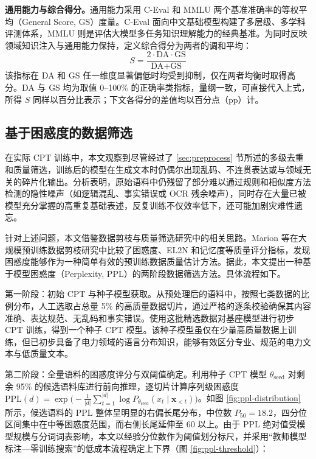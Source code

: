\documentclass[fontset=fandol,type=master,campus=shenzhen,etitleauto=true]{hithesisbook}
\begin{document}
\textbf{通用能力与综合得分。}通用能力采用 C-Eval 和 MMLU 两个基准准确率的等权平均（General Score, GS）度量。C-Eval 面向中文基础模型构建了多层级、多学科评测体系\cite{ref66}，MMLU 则是评估大模型多任务知识理解能力的经典基准\cite{ref67}。为同时反映领域知识注入与通用能力保持，定义综合得分为两者的调和平均：
\begin{equation}
S = \frac{2 \cdot \text{DA} \cdot \text{GS}}{\text{DA} + \text{GS}}
\end{equation}
该指标在 DA 和 GS 任一维度显著偏低时均受到抑制，仅在两者均衡时取得高分。DA 与 GS 均为取值 0--100\% 的正确率类指标，量纲一致，可直接代入上式，所得 $S$ 同样以百分比表示；下文各得分的差值均以百分点（pp）计。

\subsection{基于困惑度的数据筛选}\label{ux57faux4e8eux56f0ux60d1ux5ea6ux7684ux6570ux636eux7b5bux9009}

在实际 CPT 训练中，本文观察到尽管经过了 \ref{sec:preprocess} 节所述的多级去重和质量筛选，训练后的模型在生成文本时仍偶尔出现乱码、不连贯表达或与领域无关的碎片化输出。分析表明，原始语料中仍残留了部分难以通过规则和相似度方法检测的隐性噪声（如逻辑混乱、事实错误或 OCR 残余噪声），同时存在大量已被模型充分掌握的高重复基础表述，反复训练不仅效率低下，还可能加剧灾难性遗忘。

针对上述问题，本文借鉴数据剪枝与质量筛选研究中的相关思路。Marion 等在大规模预训练数据剪枝研究中比较了困惑度、EL2N 和记忆度等质量评分指标，发现困惑度能够作为一种简单有效的预训练数据质量估计方法\cite{ref58}。据此，本文提出一种基于模型困惑度（Perplexity, PPL）的两阶段数据筛选方法。具体流程如下。

第一阶段：初始 CPT 与种子模型获取。从预处理后的语料中，按照七类数据的比例分布，人工选取占总量 5\% 的高质量数据切片，通过严格的逐条校验确保其内容准确、表达规范、无乱码和事实错误。使用这批精选数据对基座模型进行初步 CPT 训练，得到一个种子 CPT 模型。该种子模型虽仅在少量高质量数据上训练，但已初步具备了电力领域的语言分布知识，能够有效区分专业、规范的电力文本与低质量文本。

第二阶段：全量语料的困惑度评分与双阈值确定。利用种子 CPT 模型 $\theta_{\text{seed}}$ 对剩余 95\% 的候选语料库进行前向推理，逐切片计算序列级困惑度 $\text{PPL}(d) = \exp\bigl(-\frac{1}{|d|}\sum_{t=1}^{|d|} \log P_{\theta_{\text{seed}}}(x_t \mid \mathbf{x}_{<t})\bigr)$。如图 \ref{fig:ppl-distribution} 所示，候选语料的 PPL 整体呈明显的右偏长尾分布，中位数 $P_{50} = 18.2$，四分位区间集中在中等困惑度范围，而右侧长尾延伸至 $60$ 以上。由于 PPL 绝对值受模型规模与分词词表影响，本文以经验分位数作为阈值划分标尺，并采用“教师模型标注—零训练搜索”的低成本流程确定上下界（图 \ref{fig:ppl-threshold}）：
\end{document}
